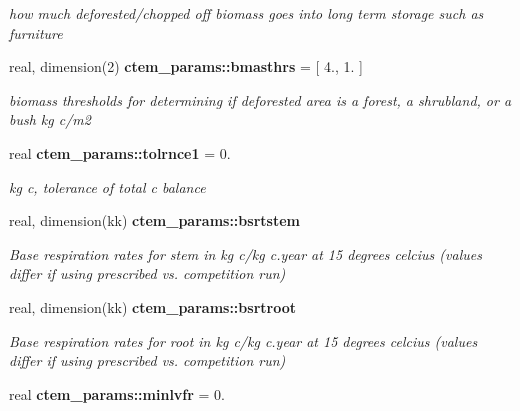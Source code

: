 \begin{DoxyCompactItemize}
\begin{DoxyCompactList}\small\item\em how much deforested/chopped off biomass goes into long term storage such as furniture \end{DoxyCompactList}\item 
\hypertarget{namespacectem__params_a49b01c9f504b799a16e1aa9224c1011f}{}real, dimension(2) {\bfseries ctem\+\_\+params\+::bmasthrs} = \mbox{[} 4., 1. \mbox{]}\label{namespacectem__params_a49b01c9f504b799a16e1aa9224c1011f}

\begin{DoxyCompactList}\small\item\em biomass thresholds for determining if deforested area is a forest, a shrubland, or a bush kg c/m2 \end{DoxyCompactList}\item 
\hypertarget{namespacectem__params_a1ecb947f804fa8a4db85cb4524c12957}{}real {\bfseries ctem\+\_\+params\+::tolrnce1} = 0.\label{namespacectem__params_a1ecb947f804fa8a4db85cb4524c12957}

\begin{DoxyCompactList}\small\item\em kg c, tolerance of total c balance \end{DoxyCompactList}\item 
\hypertarget{namespacectem__params_a3e315466e92bff767c21df28defa0a96}{}real, dimension(kk) {\bfseries ctem\+\_\+params\+::bsrtstem}\label{namespacectem__params_a3e315466e92bff767c21df28defa0a96}

\begin{DoxyCompactList}\small\item\em Base respiration rates for stem in kg c/kg c.\+year at 15 degrees celcius (values differ if using prescribed vs. competition run) \end{DoxyCompactList}\item 
\hypertarget{namespacectem__params_a38e12fbd4194b73db2a5d635ffb9701b}{}real, dimension(kk) {\bfseries ctem\+\_\+params\+::bsrtroot}\label{namespacectem__params_a38e12fbd4194b73db2a5d635ffb9701b}

\begin{DoxyCompactList}\small\item\em Base respiration rates for root in kg c/kg c.\+year at 15 degrees celcius (values differ if using prescribed vs. competition run) \end{DoxyCompactList}\item 
\hypertarget{namespacectem__params_afd2af8cee888fd84bf7e89a6a2b5c981}{}real {\bfseries ctem\+\_\+params\+::minlvfr} = 0.\label{namespacectem__params_afd2af8cee888fd84bf7e89a6a2b5c981}


\end{DoxyCompactItemize}

